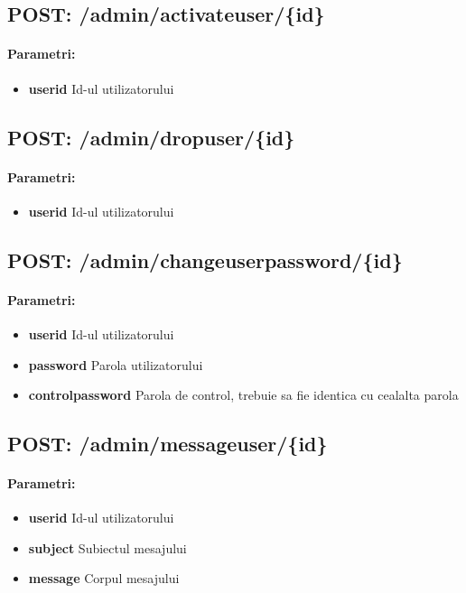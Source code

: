  \subsection*{POST: /admin/activateuser/\{id\}}

\paragraph{Parametri:}
\begin{itemize}
\item \textbf{userid}
 Id-ul utilizatorului
 \end{itemize}
 \subsection*{POST: /admin/dropuser/\{id\}}

\paragraph{Parametri:}
\begin{itemize}
\item \textbf{userid}
 Id-ul utilizatorului
 \end{itemize}
 \subsection*{POST: /admin/changeuserpassword/\{id\}}

\paragraph{Parametri:}
\begin{itemize}
\item \textbf{userid}
 Id-ul utilizatorului
\item \textbf{password}
 Parola utilizatorului
\item \textbf{controlpassword}
 Parola de control, trebuie sa fie identica cu cealalta parola
 \end{itemize}
 \subsection*{POST: /admin/messageuser/\{id\}}

\paragraph{Parametri:}
\begin{itemize}
\item \textbf{userid}
 Id-ul utilizatorului
\item \textbf{subject}
 Subiectul mesajului 
\item \textbf{message}
 Corpul mesajului
 \end{itemize}
